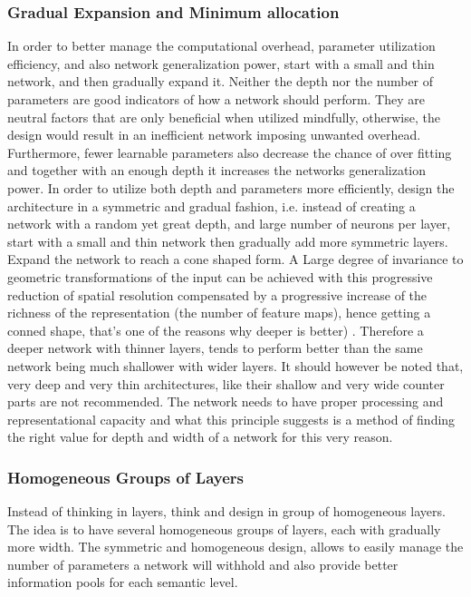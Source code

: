 \documentclass{article} \usepackage{lets_keepit_simple,times}
\begin{document}
\subsubsection{Gradual Expansion and Minimum allocation}
In order to better manage the computational overhead, parameter utilization efficiency, and also network generalization power, start with a small and thin network, and then gradually expand it. Neither the depth nor the number of parameters are good indicators of how a network should perform. They are neutral factors that are only beneficial when utilized mindfully, otherwise, the design would result in an inefficient network imposing unwanted overhead. Furthermore, fewer learnable parameters also decrease the chance of over fitting and together with an enough depth it increases the networks generalization power. In order to utilize both depth and parameters more efficiently, design the architecture in a symmetric and gradual fashion, i.e. instead of creating a network with a random yet great depth, and large number of neurons per layer, start with a small and thin network then gradually add more symmetric layers. Expand the network to reach a cone shaped form. A Large degree of invariance to geometric transformations of the input can be achieved with this progressive reduction of spatial resolution compensated by a progressive increase of the richness of the representation (the number of feature maps), hence getting a conned shape, that's one of the reasons why deeper is better) \cite{Lecun_GradientBased_CNN_1998}. Therefore a deeper network with thinner layers, tends to perform better than the same network being much shallower with wider layers. It should however be noted that, very deep and very thin architectures, like their shallow and very wide counter parts are not recommended. The network needs to have proper processing and representational capacity and what this principle suggests is a method of finding the right value for depth and width of a network for this very reason. 

\subsubsection{Homogeneous Groups of Layers}
Instead of thinking in layers, think and design in group of homogeneous layers. The idea is to have several homogeneous groups of layers, each with gradually more width. The symmetric and homogeneous design, allows to easily manage the number of parameters a network will withhold and also provide better information pools for each semantic level.  
\end{document}
